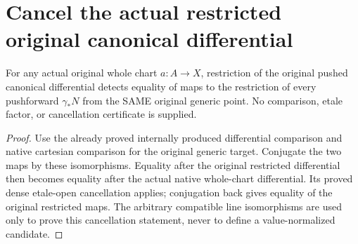 \section{Cancel the actual restricted original canonical differential}
\begin{lemma}
\label{lem:kn-canonical-restricted-original-differential-cancellation}
\leanok
For any actual original whole chart $a:A\to X$, restriction of the original
pushed canonical differential detects equality of maps to the restriction
of every pushforward $\gamma_*N$ from the SAME original generic point.
No comparison, etale factor, or cancellation certificate is supplied.
\end{lemma}
\begin{proof}
Use the already proved internally produced differential comparison and
native cartesian comparison for the original generic target. Conjugate
the two maps by these isomorphisms. Equality after the original
restricted differential then becomes equality after the actual native
whole-chart differential. Its proved dense etale-open cancellation applies;
conjugation back gives equality of the original restricted maps.
The arbitrary compatible line isomorphisms are used only to prove this
cancellation statement, never to define a value-normalized candidate.
\end{proof}
